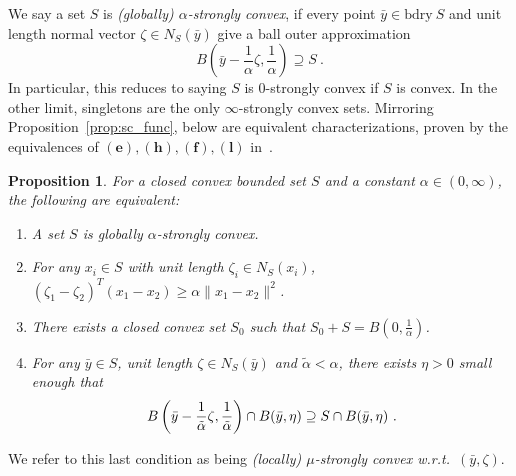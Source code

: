 \documentclass[sn-mathphys,Numbered]{sn-jnl}%
\newcommand{\bdry}{\mathrm{bdry\ }}
\newtheorem{proposition}[theorem]{Proposition}%
\begin{document}
We say a set $S$ is {\it (globally) $\alpha$-strongly convex}, if every point $\bar y\in\bdry S$ and unit length normal vector $\zeta\in N_S(\bar y)$ give a ball outer approximation
\begin{equation}\label{eq:outer-ball}
    B\left(\bar y - \frac{1}{\alpha}\zeta, \frac{1}{\alpha}\right) \supseteq S \ .
\end{equation}
In particular, this reduces to saying $S$ is $0$-strongly convex if $S$ is convex. In the other limit, singletons are the only $\infty$-strongly convex sets. Mirroring Proposition~\ref{prop:sc_func}, below are equivalent characterizations, proven by the equivalences of $\mathbf{(e),(h),(f),(l)}$ in~\cite[Theorem 2.1, page 265-266]{goncharov2017strong}.

\begin{proposition}\label{prop:sc_set}
For a closed convex bounded set $S$ and a constant $\alpha\in (0,\infty)$, the following are equivalent:
\begin{enumerate}[label=(\alph*)]
    \item A set $S$ is globally $\alpha$-strongly convex.
    \item For any $x_i \in S$ with unit length $\zeta_i \in N_S(x_i)$,  $ (\zeta_1-\zeta_2)^T(x_1-x_2)\geq \alpha \|x_1-x_2\|^2 $.
    \item There exists a closed convex set $S_0$ such that  $S_0+S = B(0, \frac{1}{\alpha})$. 
    \item For any $\bar y\in S$, unit length $\zeta\in N_S(\bar y)$ and $\tilde \alpha < \alpha$, there exists $\eta>0$ small enough that $$ B\left(\bar y - \frac{1}{\Tilde{\alpha}}\zeta, \frac{1}{\Tilde{\alpha}}\right) \cap B(\bar y, \eta) \supseteq S \cap B(\bar y, \eta) \ . $$ 
\end{enumerate}
\end{proposition}

\noindent We refer to this last condition as being {\it (locally) $\mu$-strongly convex w.r.t.~$(\bar y, \zeta)$}. 




\end{document}

